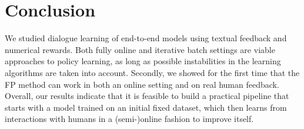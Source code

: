 \section{Conclusion}



We studied dialogue learning of end-to-end models using textual feedback and numerical rewards.
Both fully online and iterative batch settings are viable approaches to policy learning, as long as
possible instabilities in the learning algorithms are taken into account. Secondly, we showed 
for the first time that the  FP method can work
in both an online setting and on real human feedback.
Overall, our results indicate that it is feasible to build a practical
 pipeline that starts with a model trained on an initial fixed dataset,
which then learns from interactions with humans  in a (semi-)online fashion to improve itself.
